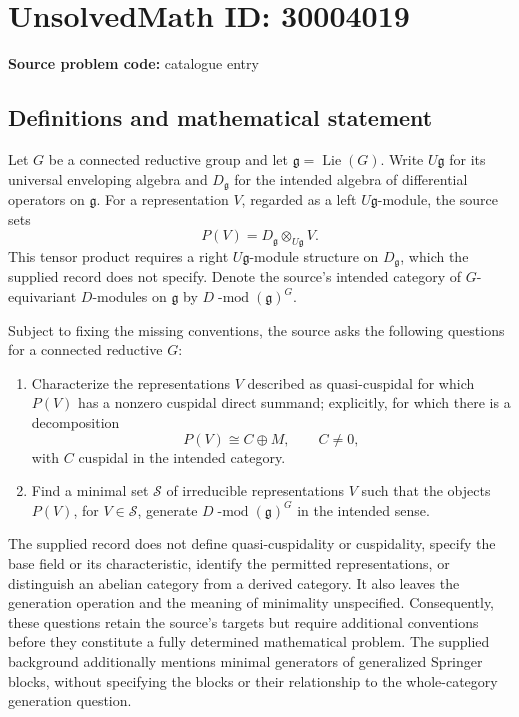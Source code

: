 \documentclass[11pt]{article}
\begin{document}
\section*{UnsolvedMath ID: 30004019}
\textbf{Source problem code:} catalogue entry
\subsection{Definitions and mathematical statement}
Let \(G\) be a connected reductive group and let \(\mathfrak g=\operatorname{Lie}(G)\). Write \(U\mathfrak g\) for its universal enveloping algebra and \(D_{\mathfrak g}\) for the intended algebra of differential operators on \(\mathfrak g\). For a representation \(V\), regarded as a left \(U\mathfrak g\)-module, the source sets
\[
P(V)=D_{\mathfrak g}\otimes_{U\mathfrak g}V.
\]
This tensor product requires a right \(U\mathfrak g\)-module structure on \(D_{\mathfrak g}\), which the supplied record does not specify. Denote the source's intended category of \(G\)-equivariant \(D\)-modules on \(\mathfrak g\) by \(D\!\operatorname{-mod}(\mathfrak g)^G\).

Subject to fixing the missing conventions, the source asks the following questions for a connected reductive \(G\):
\begin{enumerate}
\item Characterize the representations \(V\) described as quasi-cuspidal for which \(P(V)\) has a nonzero cuspidal direct summand; explicitly, for which there is a decomposition
\[
P(V)\cong C\oplus M,
\qquad C\ne 0,
\]
with \(C\) cuspidal in the intended category.
\item Find a minimal set \(\mathcal S\) of irreducible representations \(V\) such that the objects \(P(V)\), for \(V\in\mathcal S\), generate \(D\!\operatorname{-mod}(\mathfrak g)^G\) in the intended sense.
\end{enumerate}

The supplied record does not define quasi-cuspidality or cuspidality, specify the base field or its characteristic, identify the permitted representations, or distinguish an abelian category from a derived category. It also leaves the generation operation and the meaning of minimality unspecified. Consequently, these questions retain the source's targets but require additional conventions before they constitute a fully determined mathematical problem. The supplied background additionally mentions minimal generators of generalized Springer blocks, without specifying the blocks or their relationship to the whole-category generation question.
\end{document}
